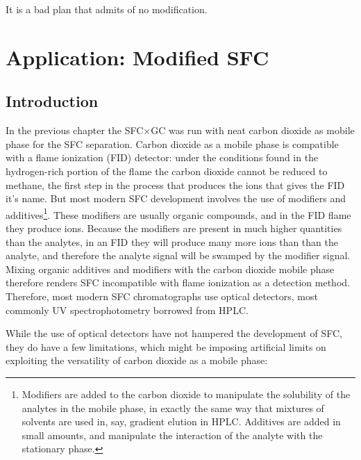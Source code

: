 
\begin{savequote}[45mm]
It is a bad plan that admits of no modification.
\end{savequote}

\chapter{Application: Modified SFC} %

\label{Chapter7} %

\section{Introduction}

In the previous chapter the SFC×GC was run with neat carbon dioxide as mobile
phase for the SFC separation. Carbon dioxide as a mobile phase is compatible with
a flame ionization (FID) detector: under the conditions found in the
hydrogen-rich portion of the flame the carbon dioxide cannot be reduced to
methane, the first step in the process that produces the ions that gives the FID
it's name. But most modern SFC development involves the use of modifiers and
additives\footnote{Modifiers are added to the carbon dioxide to manipulate the
solubility of the analytes in the mobile phase, in exactly the same way that
mixtures of solvents are used in, say, gradient elution in HPLC. Additives are
added in small amounts, and manipulate the interaction of the analyte with the
stationary phase.}. These modifiers are usually organic compounds, and in the FID
flame they produce ions. Because the modifiers are present in much higher
quantities than the analytes, in an FID they will produce many more ions than
than the analyte, and therefore the analyte signal will be swamped by the
modifier signal. Mixing organic additives and modifiers
with the carbon dioxide mobile phase therefore renders SFC incompatible
with flame ionization as a detection method. Therefore, most modern SFC
chromatographs use optical detectors, most commonly UV spectrophotometry
borrowed from HPLC.

While the use of optical detectors have not hampered the development of SFC,
they do have a few limitations, which might be imposing artificial limits on
exploiting the versatility of carbon dioxide as a mobile phase:

